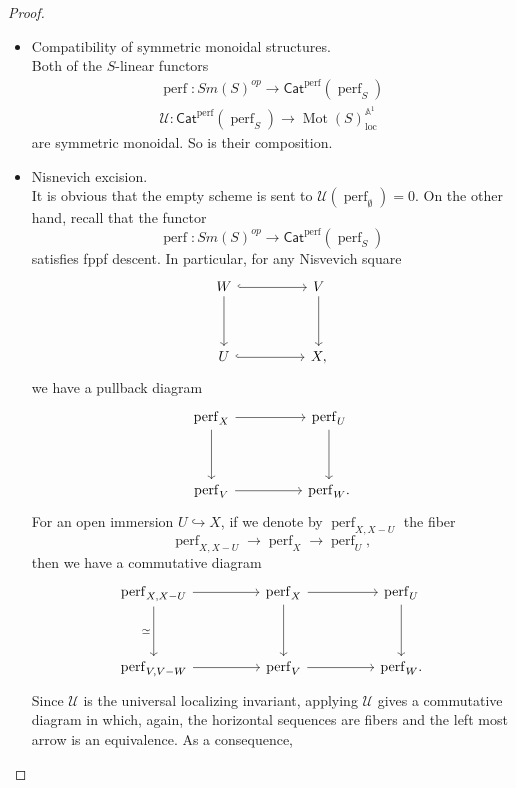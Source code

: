 \documentclass[10pt,a4paper]{amsart}
\newcommand{\on}{\operatorname}
\begin{document}
\begin{proof}
\begin{itemize}
\item Compatibility of symmetric monoidal structures.\\
Both of the $S$-linear functors\[
\begin{gathered}
\on{perf}:Sm(S)^{op}\rightarrow \mathsf{Cat}^{\on{perf}}(\on{perf}_S)\\
\mathcal{U}:\mathsf{Cat}^{\on{perf}}(\on{perf}_S)\rightarrow\on{Mot}(S)_{\on{loc}}^{\mathbb{A}^1}
\end{gathered}
\]
are symmetric monoidal. So is their composition.
\item Nisnevich excision.\\
It is obvious that the empty scheme is sent to $\mathcal{U}(\on{perf}_{\emptyset})=0$. On the other hand, recall that the functor\[
\on{perf}:Sm(S)^{op}\rightarrow \mathsf{Cat}^{\on{perf}}(\on{perf}_S)\]
satisfies fppf descent. In particular, for any Nisvevich square
\[\begin{tikzcd}
	W && V \\
	\\
	U && X
	\arrow[hook, from=1-1, to=1-3]
	\arrow[from=1-1, to=3-1]
	\arrow[from=1-3, to=3-3]
	\arrow[hook, from=3-1, to=3-3],
\end{tikzcd}\]
we have a pullback diagram
\[\begin{tikzcd}
	{\on{perf}_X} && {\on{perf}_U} \\
	\\
	{\on{perf}_V} && {\on{perf}_W}
	\arrow[from=1-1, to=1-3]
	\arrow[from=1-1, to=3-1]
	\arrow[from=1-3, to=3-3]
	\arrow[from=3-1, to=3-3].
\end{tikzcd}\]
For an open immersion $U\hookrightarrow X$, if we denote by $\on{perf}_{X,X-U}$ the fiber\[
\on{perf}_{X,X-U}\rightarrow\on{perf}_X\rightarrow\on{perf}_U,\]
then we have a commutative diagram
\[\begin{tikzcd}
	{\on{perf}_{X,X-U}} && {\on{perf}_X} && {\on{perf}_U} \\
	\\
	{\on{perf}_{V,V-W}} && {\on{perf}_V} && {\on{perf}_W}
	\arrow[from=1-1, to=1-3]
	\arrow["\simeq"', from=1-1, to=3-1]
	\arrow[from=1-3, to=1-5]
	\arrow[from=1-3, to=3-3]
	\arrow[from=1-5, to=3-5]
	\arrow[from=3-1, to=3-3]
	\arrow[from=3-3, to=3-5].
\end{tikzcd}\]
Since $\mathcal{U}$ is the universal localizing invariant, applying $\mathcal{U}$ gives a commutative diagram in which, again, the horizontal sequences are fibers and the left most arrow is an equivalence. As a consequence,

\end{itemize}
\end{proof}
\end{document}

